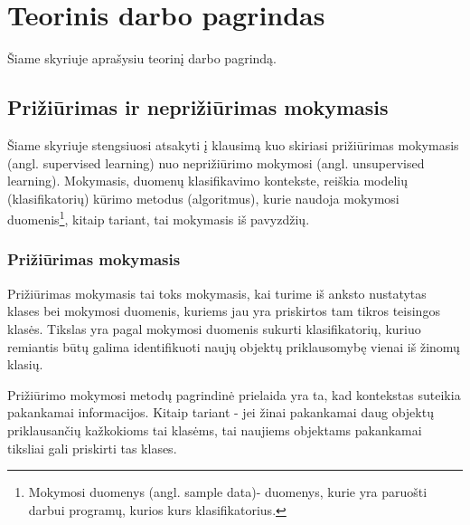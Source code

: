 \section{Teorinis darbo pagrindas}
Šiame skyriuje aprašysiu teorinį darbo pagrindą.

\subsection{Prižiūrimas ir neprižiūrimas mokymasis}

Šiame skyriuje stengsiuosi atsakyti į klausimą kuo skiriasi prižiūrimas mokymasis
(angl. supervised learning) nuo neprižiūrimo mokymosi (angl. unsupervised
learning). Mokymasis, duomenų klasifikavimo kontekste, reiškia modelių
(klasifikatorių) kūrimo metodus (algoritmus), kurie naudoja
mokymosi duomenis\footnote{Mokymosi duomenys (angl. sample data)- duomenys,
kurie yra paruošti darbui programų, kurios kurs klasifikatorius.}, kitaip
tariant, tai mokymasis iš pavyzdžių.

\subsubsection{Prižiūrimas mokymasis}

Prižiūrimas mokymasis tai toks mokymasis, kai turime iš anksto nustatytas
klases bei mokymosi duomenis, kuriems jau yra priskirtos tam tikros
teisingos klasės. Tikslas yra pagal mokymosi duomenis sukurti klasifikatorių,
kuriuo remiantis būtų galima identifikuoti naujų objektų priklausomybę vienai iš
žinomų klasių.\cite{markhall99}


\begin{comment}
Prižiūrimojo mokymosi esmė: turime aibę duomenų, kurios objektai yra vadinami
įėjimo duomenimis (angl. Input) arba nepriklausomais kintamaisiais (angl.
Independent variables), jų reikšmės yra išmatuotos arba nustatytos. Darome prielaidą, 
kad nepriklausomi kintamieji turi įtakos vienam ar daugiau rezultato kintamųjų 
(angl. Output) arba priklausomų kintamųjų (angl. Dependent variables). Paėmus dar vieną 
duomenų objektą (angl. Tuple), tikslas yra pagal nepriklausomus kintamuosius nuspėti priklausomus kintamuosius.
\end{comment}

Prižiūrimo mokymosi metodų pagrindinė prielaida yra ta, kad kontekstas suteikia
pakankamai informacijos. Kitaip tariant - jei žinai pakankamai daug objektų priklausančių kažkokioms tai 
klasėms, tai naujiems objektams pakankamai tiksliai gali priskirti tas klases.

